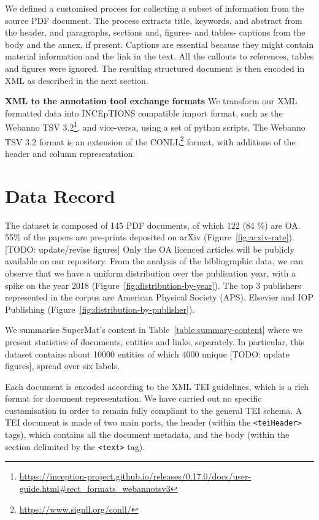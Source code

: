 \documentclass[fleqn,10pt]{wlscirep}
\begin{document}
We defined a customised process for collecting a subset of information from the source PDF document.
The process extracts title, keywords, and abstract from the header, and paragraphs, sections and, figures- and tables- captions from the body and the annex, if present.
Captions are essential because they might contain material information and the link in the text. 
All the callouts to references, tables and figures were ignored.
The resulting structured document is then encoded in XML as described in the next section. 

\textbf{XML to the annotation tool exchange formats}
We transform our XML formatted data into INCEpTIONS compatible import format, such as the Webanno TSV 3.2\footnote{\url{https://inception-project.github.io/releases/0.17.0/docs/user-guide.html\#sect_formats_webannotsv3}}, and vice-versa, using a set of python scripts. 
The Webanno TSV 3.2 format is an extension of the CONLL\footnote{\url{https://www.signll.org/conll/}} format, with additions of the header and column representation.

\section*{Data Record}
\label{sec:data-record}
The dataset is composed of 145 PDF documents, of which 122 (84 \%) are OA. 55\% of the papers are pre-prints deposited on arXiv (Figure~\ref{fig:arxiv-rate}). [TODO: update/revise figures]
Only the OA licenced articles will be publicly available on our repository. 
From the analysis of the bibliographic data, we can observe that we have a uniform distribution over the publication year, with a spike on the year 2018 (Figure~\ref{fig:distribution-by-year}). The top 3 publishers represented in the corpus are American Physical Society (APS), Elsevier and IOP Publishing (Figure~\ref{fig:distribution-by-publisher}).

We summarise SuperMat's content in Table~\ref{table:summary-content} where we present statistics of documents, entities and links, separately. In particular, this dataset contains about 10000 entities of which 4000 unique [TODO: update figures], spread over six labels. 


Each document is encoded according to the XML TEI guidelines, which is a rich format for document representation. We have carried out no specific customisation in order to remain fully compliant to the general TEI schema. A TEI document is made of two main parts, the header (within the \texttt{<teiHeader>} tags), which contains all the document metadata, and the body (within the section delimited by the \texttt{<text>} tag). 
\end{document}
